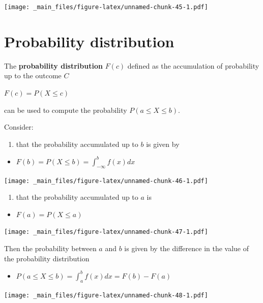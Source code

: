 \documentclass[
]{book}
\providecommand{\tightlist}{%
  \setlength{\itemsep}{0pt}\setlength{\parskip}{0pt}}
\begin{document}
\texttt{[image: \_main\_files/figure-latex/unnamed-chunk-45-1.pdf]}

\hypertarget{probability-distribution-1}{%
\section{Probability distribution}\label{probability-distribution-1}}

The \textbf{probability distribution} \(F(c)\) defined as the accumulation of probability up to the outcome \(C\)

\(F(c) = P(X \leq c)\)

can be used to compute the probability \(P(a \leq X \leq b)\).

Consider:

\begin{enumerate}
\def\labelenumi{\arabic{enumi})}
\tightlist
\item
  that the probability accumulated up to \(b\) is given by
\end{enumerate}

\begin{itemize}
\tightlist
\item
  \(F(b) = P(X \leq b)=\int_{-\infty}^bf(x)dx\)
\end{itemize}

\texttt{[image: \_main\_files/figure-latex/unnamed-chunk-46-1.pdf]}

\begin{enumerate}
\def\labelenumi{\arabic{enumi})}
\setcounter{enumi}{1}
\tightlist
\item
  that the probability accumulated up to \(a\) is
\end{enumerate}

\begin{itemize}
\tightlist
\item
  \(F(a) = P(X \leq a)\)
\end{itemize}

\texttt{[image: \_main\_files/figure-latex/unnamed-chunk-47-1.pdf]}

Then the probability between \(a\) and \(b\) is given by the difference in the value of the probability distribution

\begin{itemize}
\tightlist
\item
  \(P(a\leq X \leq b) = \int_a^b f(x)dx=F(b)-F(a)\)
\end{itemize}

\texttt{[image: \_main\_files/figure-latex/unnamed-chunk-48-1.pdf]}
\end{document}
